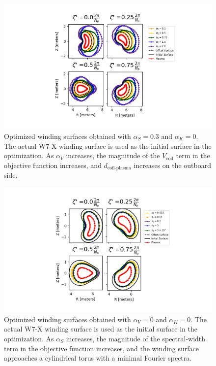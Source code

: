 \documentclass[aps,unsortedaddress]{revtex4-1}
\begin{document}
\begin{figure}
\includegraphics[width=.8\textwidth]{alpha1_scan.png}
\caption{Optimized winding surfaces obtained with $\alpha_S = 0.3$ and $\alpha_K = 0$. The actual W7-X winding surface is used as the initial surface in the optimization. As $\alpha_V$ increases, the magnitude of the $V_{\text{coil}}$ term in the objective function increases, and $d_{\text{coil-plasma}}$ increases on the outboard side. }
\label{alpha1_scan}
\end{figure}

\begin{figure}
\includegraphics[width=.8\textwidth]{alpha2_scan.png}
\caption{Optimized winding surfaces obtained with $\alpha_V = 0$ and $\alpha_K = 0$. The actual W7-X winding surface is used as the initial surface in the optimization. As $\alpha_S$ increases, the magnitude of the spectral-width term in the objective function increases, and the winding surface approaches a cylindrical torus with a minimal Fourier spectra.}
\label{alpha2_scan}
\end{figure}

\FloatBarrier
\end{document}
